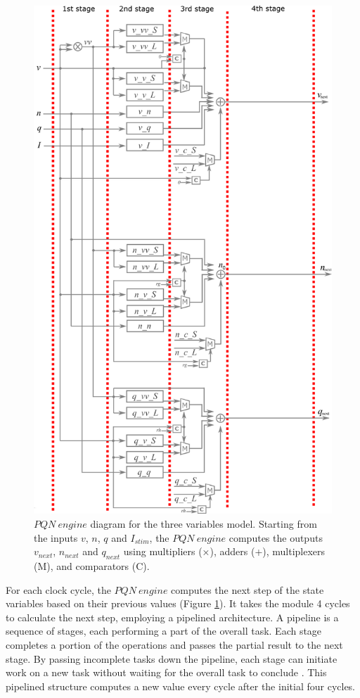 \begin{figure}[hbt!]
    \begin{center}
    \includegraphics[width=0.7\linewidth]{img/block_diagram.png}
    \end{center}
    \caption[$PQN\ engine$ pipeline]{$PQN\ engine$ diagram for the three variables model. Starting from the inputs $v$, $n$, $q$ and $I_{stim}$, the $PQN\ engine$ computes the outputs $v_{next}$, $n_{next}$ and $q_{next}$ using multipliers (×), adders (+), multiplexers (M), and
    comparators (C).}
    \label{fig:RSstages}
\end{figure}

For each clock cycle, the $PQN\ engine$ computes the next step of the state variables based on their previous values (Figure \ref{fig:RSstages}). 
It takes the module 4 cycles to calculate the next step, employing a pipelined architecture. A pipeline is a sequence of stages, each performing a 
part of the overall task. Each stage completes a portion of the operations and passes the partial result to the next stage. 
By passing incomplete tasks down the pipeline, each stage can initiate work on a new task without waiting for the overall task to conclude \cite{Dally}. 
This pipelined structure computes a new value every cycle after the initial four cycles.\\


